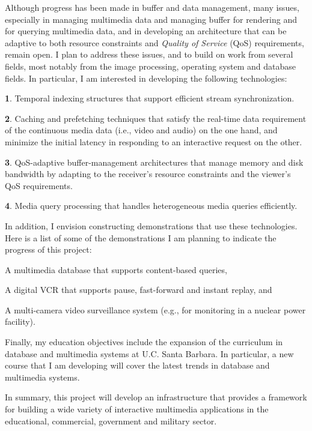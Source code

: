 Although progress has been made in buffer and
data management, many issues, especially in managing multimedia
data and managing buffer for rendering and
for querying multimedia data,
and in developing an architecture that can be adaptive
to both resource constraints and {\em Quality of
Service} (QoS) requirements, remain open.
I plan to address these issues, and to build on
work from several fields, most notably from the
image processing, operating system and database fields.
In particular, I am interested in developing the 
following technologies:

\begin{nlist}
\item {\bf 1}.
Temporal indexing structures that support
efficient stream synchronization.
\item {\bf 2}. Caching and prefetching techniques that satisfy
the real-time data requirement of the continuous media data
(i.e., video and audio) on the one hand, and minimize the
initial latency in responding to an interactive request
on the other.
\item {\bf 3}.  
QoS-adaptive buffer-management architectures that manage
memory and disk bandwidth by adapting to
the receiver's resource constraints and
the viewer's QoS requirements.
\item {\bf 4}.
Media query processing that handles heterogeneous
media queries efficiently. 
\end{nlist}

In addition, I envision constructing demonstrations 
that use these technologies.
Here is a list of some of the demonstrations I am planning
to indicate the progress of this project:
\begin{jlist}
\item 
A multimedia database that supports content-based 
queries,
\item 
A digital VCR that supports pause, fast-forward and instant 
replay, and
\item 
A multi-camera video surveillance system (e.g., for 
monitoring in a nuclear power facility).
\end{jlist}


Finally, my education objectives include the expansion of
the curriculum in database and multimedia systems at U.C. Santa
Barbara. In particular, a new course that I am developing
will cover the latest 
trends in database and multimedia systems. 

In summary, this project will develop an infrastructure 
that provides a framework for building
a wide variety of interactive multimedia applications
in the educational, commercial, government and
military sector.

